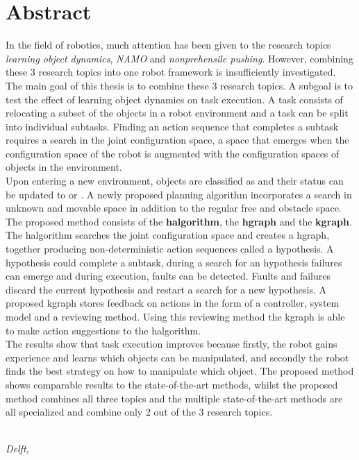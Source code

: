 \chapter*{Abstract}
In the field of robotics, much attention has been given to the research topics \textit{learning object dynamics}, \textit{\acf{NAMO}} and \textit{nonprehensile pushing}. However, combining these 3 research topics into one robot framework is insufficiently investigated. The main goal of this thesis is to combine these 3 research topics. A subgoal is to test the effect of learning object dynamics on task execution. A task consists of relocating a subset of the objects in a robot environment and a task can be split into individual subtasks. Finding an action sequence that completes a subtask requires a search in the joint configuration space, a space that emerges when the configuration space of the robot is augmented with the configuration spaces of objects in the environment.\\Upon entering a new environment, objects are classified as  and their status can be updated to  or . A newly proposed planning algorithm incorporates a search in unknown and movable space in addition to the regular free and obstacle space. The proposed method consists of the \textbf{\acl{halgorithm}}, the \textbf{\acl{hgraph}} and the \textbf{\acl{kgraph}}. The \acl{halgorithm} searches the joint configuration space and creates a \acl{hgraph}, together producing non-deterministic action sequences called a hypothesis. A hypothesis could complete a subtask, during a search for an hypothesis failures can emerge and during execution, faults can be detected. Faults and failures discard the current hypothesis and restart a search for a new hypothesis. A proposed \acl{kgraph} stores feedback on actions in the form of a controller, system model and a reviewing method. Using this reviewing method the \acl{kgraph} is able to make action suggestions to the \acl{halgorithm}.\\ The results show that task execution improves because firstly, the robot gains experience and learns which objects can be manipulated, and secondly the robot finds the best strategy on how to manipulate which object. The proposed method shows comparable results to the state-of-the-art methods, whilst the proposed method combines all three topics and the multiple state-of-the-art methods are all specialized and combine only 2 out of the 3 research topics.

\begin{flushright}
{\makeatletter\itshape
    \@author \\
    Delft, \monthname{} \the\year{}
\makeatother}
\end{flushright}
